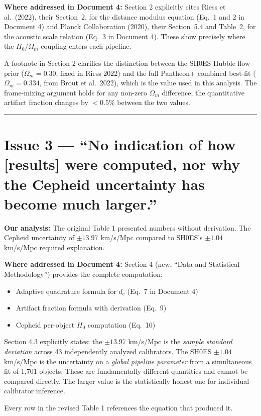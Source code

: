 \documentclass[12pt,a4paper]{article}
\begin{document}
\textbf{Where addressed in Document 4:}
Section 2 explicitly cites Riess et al.\ (2022), their Section~2,
for the distance modulus equation (Eq.\ 1 and 2 in Document 4) and
Planck Collaboration (2020), their Section~5.4 and Table~2, for the
acoustic scale relation (Eq.\ 3 in Document 4). These show precisely
where the $H_0$/$\Omega_m$ coupling enters each pipeline.

A footnote in Section 2 clarifies the distinction between the SH0ES
Hubble flow prior ($\Omega_m = 0.30$, fixed in Riess 2022) and the
full Pantheon+ combined best-fit ($\Omega_m = 0.334$, from Brout et
al.\ 2022), which is the value used in this analysis. The frame-mixing
argument holds for any non-zero $\Omega_m$ difference; the quantitative
artifact fraction changes by $<0.5$\% between the two values.

\bigskip
\hrule
\bigskip

\section*{Issue 3 — ``No indication of how [results] were computed,
nor why the Cepheid uncertainty has become much larger.''}

\textbf{Our analysis:} The original Table 1 presented numbers without
derivation. The Cepheid uncertainty of $\pm13.97$ km/s/Mpc compared
to SH0ES's $\pm1.04$ km/s/Mpc required explanation.

\textbf{Where addressed in Document 4:}
Section 4 (new, ``Data and Statistical Methodology'') provides the
complete computation:
\begin{itemize}[noitemsep]
    \item Adaptive quadrature formula for $d_c$ (Eq.~7 in Document 4)
    \item Artifact fraction formula with derivation (Eq.~9)
    \item Cepheid per-object $H_0$ computation (Eq.~10)
\end{itemize}
Section 4.3 explicitly states: the $\pm13.97$ km/s/Mpc is the
\emph{sample standard deviation} across 43 independently analyzed
calibrators. The SH0ES $\pm1.04$ km/s/Mpc is the uncertainty on a
\emph{global pipeline parameter} from a simultaneous fit of 1,701
objects. These are fundamentally different quantities and cannot be
compared directly. The larger value is the statistically honest one
for individual-calibrator inference.

Every row in the revised Table 1 references the equation that
produced it.
\end{document}

